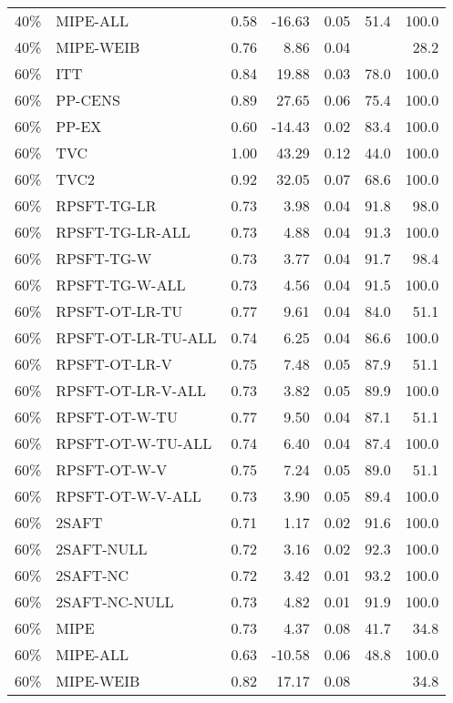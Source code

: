 \begin{table}[ht]
{\begin{tabular}{llrrrrr}
  40\% & MIPE-ALL & 0.58 & -16.63 & 0.05 & 51.4 & 100.0 \\ 
  40\% & MIPE-WEIB & 0.76 & 8.86 & 0.04 &  & 28.2 \\ 
   \hline
60\% & ITT & 0.84 & 19.88 & 0.03 & 78.0 & 100.0 \\ 
  60\% & PP-CENS & 0.89 & 27.65 & 0.06 & 75.4 & 100.0 \\ 
  60\% & PP-EX & 0.60 & -14.43 & 0.02 & 83.4 & 100.0 \\ 
  60\% & TVC & 1.00 & 43.29 & 0.12 & 44.0 & 100.0 \\ 
  60\% & TVC2 & 0.92 & 32.05 & 0.07 & 68.6 & 100.0 \\ 
   \hline
60\% & RPSFT-TG-LR & 0.73 & 3.98 & 0.04 & 91.8 & 98.0 \\ 
  60\% & RPSFT-TG-LR-ALL & 0.73 & 4.88 & 0.04 & 91.3 & 100.0 \\ 
  60\% & RPSFT-TG-W & 0.73 & 3.77 & 0.04 & 91.7 & 98.4 \\ 
  60\% & RPSFT-TG-W-ALL & 0.73 & 4.56 & 0.04 & 91.5 & 100.0 \\ 
  60\% & RPSFT-OT-LR-TU & 0.77 & 9.61 & 0.04 & 84.0 & 51.1 \\ 
  60\% & RPSFT-OT-LR-TU-ALL & 0.74 & 6.25 & 0.04 & 86.6 & 100.0 \\ 
  60\% & RPSFT-OT-LR-V & 0.75 & 7.48 & 0.05 & 87.9 & 51.1 \\ 
  60\% & RPSFT-OT-LR-V-ALL & 0.73 & 3.82 & 0.05 & 89.9 & 100.0 \\ 
   \hline
60\% & RPSFT-OT-W-TU & 0.77 & 9.50 & 0.04 & 87.1 & 51.1 \\ 
  60\% & RPSFT-OT-W-TU-ALL & 0.74 & 6.40 & 0.04 & 87.4 & 100.0 \\ 
  60\% & RPSFT-OT-W-V & 0.75 & 7.24 & 0.05 & 89.0 & 51.1 \\ 
  60\% & RPSFT-OT-W-V-ALL & 0.73 & 3.90 & 0.05 & 89.4 & 100.0 \\ 
   \hline
60\% & 2SAFT & 0.71 & 1.17 & 0.02 & 91.6 & 100.0 \\ 
  60\% & 2SAFT-NULL & 0.72 & 3.16 & 0.02 & 92.3 & 100.0 \\ 
  60\% & 2SAFT-NC & 0.72 & 3.42 & 0.01 & 93.2 & 100.0 \\ 
  60\% & 2SAFT-NC-NULL & 0.73 & 4.82 & 0.01 & 91.9 & 100.0 \\ 
  60\% & MIPE & 0.73 & 4.37 & 0.08 & 41.7 & 34.8 \\ 
  60\% & MIPE-ALL & 0.63 & -10.58 & 0.06 & 48.8 & 100.0 \\ 
  60\% & MIPE-WEIB & 0.82 & 17.17 & 0.08 &  & 34.8 \\ 
   \hline
\end{tabular}
}
\end{table}
